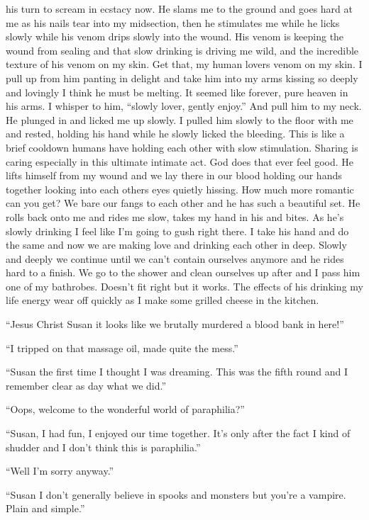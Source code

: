 his turn to scream in ecstacy now. He slams me to the ground and goes hard at me as his nails tear into my midsection, then he stimulates me while he licks slowly while his venom drips slowly into the wound. His venom is keeping the wound from sealing and that slow drinking is driving me wild, and the incredible texture of his venom on my skin. Get that, my human lovers venom on my skin. I pull up from him panting in delight and take him into my arms kissing so deeply and lovingly I think he must be melting. It seemed like forever, pure heaven in his arms. I whisper to him, ``slowly lover, gently enjoy.'' And pull him to my neck. He plunged in and licked me up slowly. I pulled him slowly to the floor with me and rested, holding his hand while he slowly licked the bleeding. This is like a brief cooldown humans have holding each other with slow stimulation. Sharing is caring especially in this ultimate intimate act. God does that ever feel good. He lifts himself from my wound and we lay there in our blood holding our hands together looking into each others eyes quietly hissing. How much more romantic can you get? We bare our fangs to each other and he has such a beautiful set. He rolls back onto me and rides me slow, takes my hand in his and bites. As he's slowly drinking I feel like I'm going to gush right there. I take his hand and do the same and now we are making love and drinking each other in deep. Slowly and deeply we continue until we can't contain ourselves anymore and he rides hard to a finish. We go to the shower and clean ourselves up after and I pass him one of my bathrobes. Doesn't fit right but it works. The effects of his drinking my life energy wear off quickly as I make some grilled cheese in the kitchen.

``Jesus Christ Susan it looks like we brutally murdered a blood bank in here!''

``I tripped on that massage oil, made quite the mess.''

``Susan the first time I thought I was dreaming. This was the fifth round and I remember clear as day what we did.''

``Oops, welcome to the wonderful world of paraphilia?''

``Susan, I had fun, I enjoyed our time together. It's only after the fact I kind of shudder and I don't think this is paraphilia.''

``Well I'm sorry anyway.''

``Susan I don't generally believe in spooks and monsters but you're a vampire. Plain and simple.''

